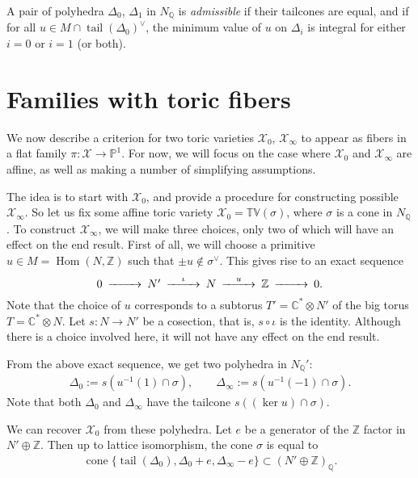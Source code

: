 \documentclass[11pt]{article}
\newcommand{\CC}{\mathbb{C}}
\newcommand{\QQ}{\mathbb{Q}}
\newcommand{\ZZ}{\mathbb Z}
\newcommand{\PP}{\mathbb{P}}
\newcommand{\tv}{\mathbb{TV}}
\newcommand{\cX}{\mathcal{X}}
\DeclareMathOperator{\cone}{cone}
\DeclareMathOperator{\tail}{tail}
\DeclareMathOperator{\Hom}{Hom}
\begin{document}
\begin{Definition}
A pair of polyhedra $\Delta_0$, $\Delta_1$ in $N_\QQ$ is \emph{admissible} if their tailcones are equal, and if for all $u\in M\cap\tail(\Delta_0)^\vee$, the  minimum value of $u$ on $\Delta_i$ is integral for either $i=0$ or $i=1$ (or both).
\end{Definition}


\section{Families with toric f\/ibers}\label{sec:fam}

We now describe a criterion for two toric varieties $\cX_0$, $\cX_\infty$ to appear as f\/ibers in
a f\/lat family $\pi:\cX\to\PP^1$. For now, we will focus on the case where $\cX_0$ and $\cX_\infty$ are af\/f\/ine, as well as making a number of simplifying assumptions.

The idea is to start with $\cX_0$, and provide a procedure for constructing possible $\cX_\infty$. So let us f\/ix some af\/f\/ine toric variety $\cX_0=\tv(\sigma)$, where $\sigma$ is a cone in $N_\QQ$. To construct $\cX_\infty$, we will make three choices, only two of which will have an ef\/fect on the end result. First of all, we will choose a primitive $u\in M=\Hom(N,\ZZ)$ such that $\pm u\notin\sigma^\vee$. This gives rise to an exact sequence
\begin{gather*}
\begin{CD}
0 @>>> N' @>\iota >> N @>u>> \ZZ @>>> 0.
\end{CD}
\end{gather*}
Note that the choice of $u$ corresponds to a subtorus $T'=\CC^*\otimes N'$ of the big torus $T=\CC^*\otimes N$.
Let $s\colon N\to N'$ be a cosection, that is, $s\circ\iota$ is the identity. Although there is a choice involved here, it will not have any ef\/fect on the end result.

From the above exact sequence, we get two polyhedra in $N_\QQ'$:
\begin{gather*}
\Delta_0 :=s(u^{-1}(1)\cap\sigma),\qquad
\Delta_\infty :=s(u^{-1}(-1)\cap\sigma).
\end{gather*}
Note that both $\Delta_0$ and $\Delta_\infty$ have the tailcone $s( (\ker u) \cap \sigma)$.

We can recover $\cX_0$ from these polyhedra. Let $e$ be a generator of the $\ZZ$ factor in $N' \oplus \ZZ$. Then up to lattice isomorphism, the cone $\sigma$ is equal to
\begin{gather*}
\cone \{\tail(\Delta_0),\Delta_0+e,\Delta_\infty-e\}\subset(N'\oplus \ZZ)_\QQ.
\end{gather*}
\end{document}
